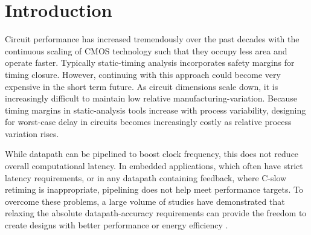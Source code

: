 \documentclass{acm_proc_article-sp}
\begin{document}
\vspace{-1ex}
\vspace{-1ex}

\section{Introduction}
Circuit performance has increased tremendously over the past decades with the continuous scaling of CMOS technology such that they occupy less area and operate faster. Typically static-timing analysis incorporates safety margins for timing closure. However, continuing with this approach could become very expensive in the short term future. As circuit dimensions scale down, it is increasingly difficult to maintain low relative manufacturing-variation. Because timing margins in static-analysis tools increase with process variability, designing for worst-case delay in circuits becomes increasingly costly as relative process variation rises.\vspace{-1ex}

While datapath can be pipelined to boost clock frequency, this does not reduce overall computational latency. In  embedded applications, which often have strict latency requirements, or in any datapath containing feedback, where C-slow retiming is inappropriate, pipelining does not help meet performance targets. To overcome these problems, a large volume of studies have demonstrated that relaxing the absolute datapath-accuracy requirements can provide the freedom to create designs with better performance or energy efficiency \cite{Razor2004,Gupta2013TransCADICS,NonUniformScaling,Undersigned2x2multiplier}.\vspace{-1ex}
\end{document}
